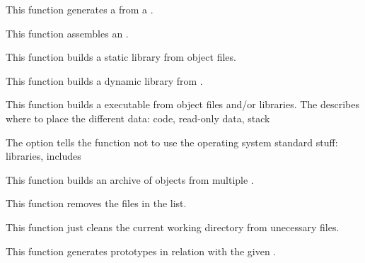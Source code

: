          {
	   This function generates a  from a
	   .
	 }

         {
	   This function assembles an .
	 }

         {
	   This function builds a static library from object files.
	 }

         {
	   This function builds a dynamic library from .
	 }

         {
	   This function builds a executable from object files and/or
	   libraries. The  describes where to
	   place the different data: code, read-only data, stack \etc{}

	   \-

	   The option  tells the function
	   not to use the operating system standard stuff: libraries, includes
	   \etc{}
	 }

         {
	   This function builds an archive of objects from multiple
	   .
	 }

         {
	   This function removes the files in the list.
	 }

         {
	   This function just cleans the current working directory from
	   unecessary files.
	 }

         {
	   This function generates prototypes in relation with the given
	   .
	 }

